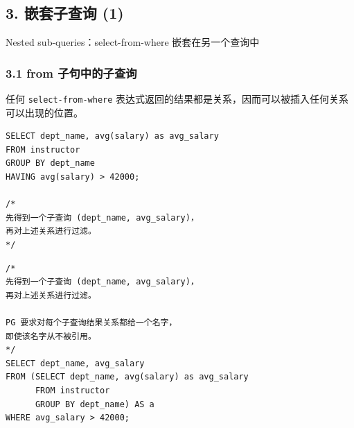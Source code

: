 \documentclass[aspectratio=169, 14pt]{beamer}
\begin{document}
\begin{frame}[fragile]
    \section{\textcolor{darkmidnightblue}{3. 嵌套子查询 (1)}}  
    Nested sub-queries：\alert{select-from-where} 嵌套在另一个查询中

\end{frame}

\begin{frame}[fragile]
    \frametitle{3.1 from 子句中的子查询}
    任何 \texttt{select-from-where} 表达式返回的结果都是关系，因而可以被插入任何关系可以出现的位置。

    \begin{verbatim}
SELECT dept_name, avg(salary) as avg_salary
FROM instructor
GROUP BY dept_name
HAVING avg(salary) > 42000;

/*
先得到一个子查询 (dept_name, avg_salary)，
再对上述关系进行过滤。
*/
    \end{verbatim} 
    
\end{frame}

\begin{frame}[fragile]

    \begin{verbatim}
/*
先得到一个子查询 (dept_name, avg_salary)，
再对上述关系进行过滤。

PG 要求对每个子查询结果关系都给一个名字，
即使该名字从不被引用。
*/
SELECT dept_name, avg_salary
FROM (SELECT dept_name, avg(salary) as avg_salary
      FROM instructor
      GROUP BY dept_name) AS a
WHERE avg_salary > 42000;
    \end{verbatim} 

\end{frame}
\end{document}
